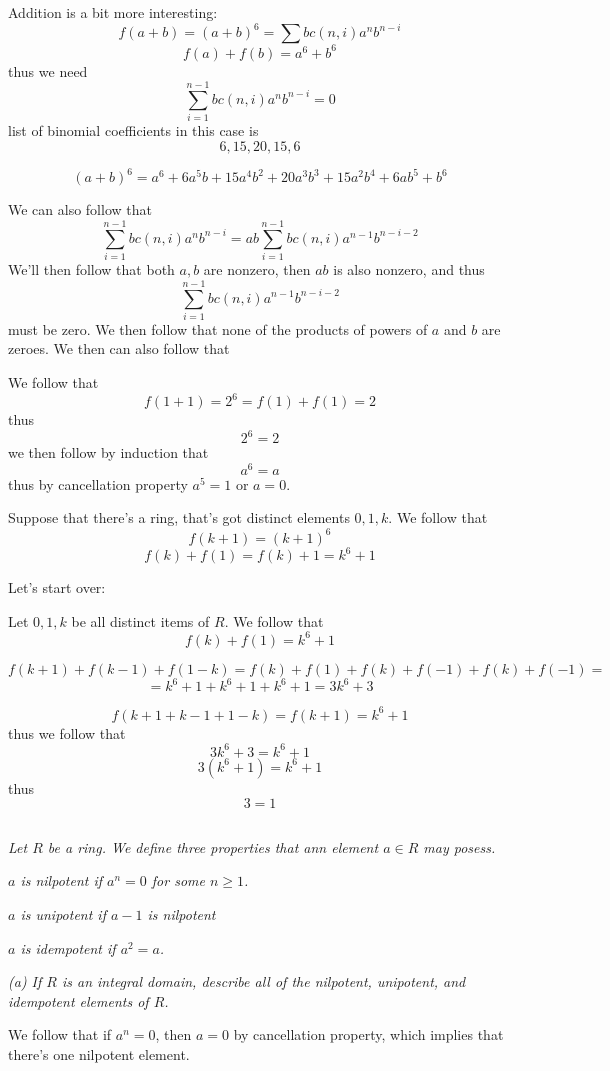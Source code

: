 \documentclass[11pt,oneside,titlepage]{book}
\begin{document}
Addition is a bit more interesting:
$$f(a + b) = (a + b)^6 = \sum{bc(n, i)a^n b^{n - i}}$$
$$f(a) + f(b) = a^6 + b^6$$
thus we need
$$\sum_{i = 1}^{n - 1}{bc(n, i)a^n b^{n - i}} = 0$$
list of binomial coefficients in this case is
$$6, 15, 20, 15, 6$$

$$(a + b)^6 = a^6 + 6a^5b + 15a^4b^2 + 20a^3b^3 + 15a^2b^4 + 6ab^5 + b^6$$

We can also follow that
$$\sum_{i = 1}^{n - 1}{bc(n, i)a^n b^{n - i}} =
ab \sum_{i = 1}^{n - 1}{bc(n, i)a^{n - 1} b^{n - i - 2}}$$
We'll then follow that both $a, b$ are nonzero, then $ab$ is also
nonzero, and thus
$$\sum_{i = 1}^{n - 1}{bc(n, i)a^{n - 1} b^{n - i - 2}}$$
must be zero. We then follow that none of the products of powers of
$a$ and $b$ are zeroes. We then can also follow that

We follow that
$$f(1 + 1) = 2^6 = f(1) + f(1) = 2$$
thus
$$2^6 = 2$$
we then follow by induction that
$$a^6 = a$$
thus by cancellation property $a^5 = 1$ or $a = 0$.

Suppose that there's a ring, that's got distinct elements $0, 1,
k$. We follow that
$$f(k + 1) = (k + 1)^6$$
$$f(k) + f(1) = f(k) + 1 = k^6 + 1$$


Let's start over:

Let $0, 1, k$ be all distinct items of $R$. We follow that
$$f(k) + f(1) = k^6 + 1$$

$$f(k + 1) + f(k - 1) + f(1 - k) =
f(k) + f(1) + f(k) + f(-1) + f(k) + f(-1) = $$
$$ = k^6 + 1 + k^6 + 1 + k^6 + 1 = 3k^6 + 3$$

$$f(k + 1 + k - 1 + 1 - k) = f(k + 1) = k^6 + 1$$
thus we follow that
$$3k^6 + 3 = k^6 + 1$$
$$3(k^6 + 1) = k^6 + 1$$
thus
$$3 = 1$$


\subsection{}

\textit{Let $R$ be a ring. We define three properties that ann element
  $a \in R$ may posess.}

\textit{$a$ is nilpotent if $a^n = 0$ for some $n \geq 1$.}

\textit{$a$ is unipotent if $a - 1$ is nilpotent}

\textit{$a$ is idempotent if $a^2 = a$.}

\textit{(a) If $R$ is an integral domain, describe all of the
  nilpotent, unipotent, and idempotent elements of $R$.}

We follow that if $a^n = 0$, then $a = 0$ by cancellation property,
which implies that there's one nilpotent element.
\end{document}
